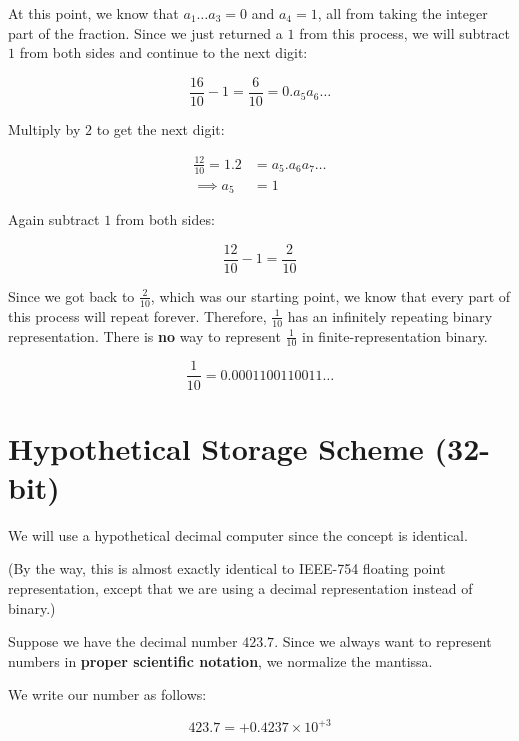 \documentclass[12pt]{article}
\begin{document}
At this point, we know that $a_1 \dots a_3 = 0$ and $a_4 = 1$, all from taking
the integer part of the fraction. Since we just returned a $1$ from this process,
we will subtract $1$ from both sides and continue to the next digit:

\begin{equation*}
  \frac{16}{10} - 1 = \frac{6}{10} = 0.a_5 a_6 \dots
\end{equation*}

Multiply by $2$ to get the next digit:

\begin{align*}
  \frac{12}{10} = 1.2 &= a_5.a_6 a_7\dots \\
  \implies a_5 &= 1
\end{align*}

Again subtract $1$ from both sides:

\begin{equation*}
  \frac{12}{10} - 1 = \frac{2}{10} 
\end{equation*}

Since we got back to $\frac{2}{10}$, which was our starting point, we know that
every part of this process will repeat forever. Therefore, $\frac{1}{10}$ has
an infinitely repeating binary representation. There is \textbf{no} way to 
represent $\frac{1}{10}$ in finite-representation binary.

\begin{equation*}
  \frac{1}{10} = 0.0001100110011\dots
\end{equation*}

\section{Hypothetical Storage Scheme (32-bit)}

We will use a hypothetical decimal computer since the concept is identical.

(By the way, this is almost exactly identical to IEEE-754 floating point
representation, except that we are using a decimal representation instead of
binary.)

Suppose we have the decimal number $423.7$. Since we always want to represent
numbers in \textbf{proper scientific notation}, we normalize the mantissa.

We write our number as follows:

\begin{equation*}
  423.7 = +0.4237 \times 10^{+3}
\end{equation*}
\end{document}
